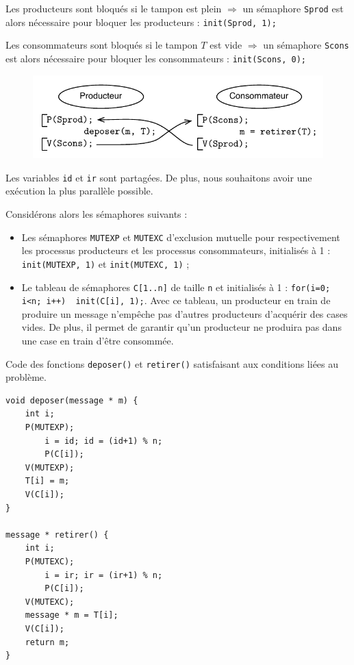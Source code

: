 \documentclass[11pt,english,french]{scrreprt}
\theoremstyle{remark}
\theoremstyle{definition}
\begin{document}
Les producteurs sont bloqués si le tampon est plein $\Rightarrow$ un sémaphore \lstinline!Sprod! est alors nécessaire pour bloquer les producteurs : \lstinline!init(Sprod, 1);!

Les consommateurs sont bloqués si le tampon $T$ est vide $\Rightarrow$ un sémaphore \lstinline!Scons! est alors nécessaire pour bloquer les consommateurs : \lstinline!init(Scons, 0);!

\begin{figure}[h!]
	\center
	\vspace{-10pt}
	\includegraphics[scale=.85]{img/prod-cons2}
	\vspace{-10pt}
\end{figure}

Les variables \lstinline!id! et \lstinline!ir! sont partagées. De plus, nous souhaitons avoir une exécution la plus parallèle possible.

Considérons alors les sémaphores suivants :\begin{itemize}
	\item Les sémaphores \lstinline!MUTEXP! et \lstinline!MUTEXC! d'exclusion mutuelle pour respectivement les processus producteurs et les processus consommateurs, initialisés à 1 : \lstinline!init(MUTEXP, 1)! et \lstinline!init(MUTEXC, 1)! ;
	\item Le tableau de sémaphores \lstinline!C[1..n]! de taille \lstinline!n! et initialisés à 1 : \lstinline!for(i=0; i<n; i++)  init(C[i], 1);!. Avec ce tableau, un producteur en train de produire un message n'empêche pas d'autres producteurs d'acquérir des cases vides. De plus, il permet de garantir qu'un producteur ne produira pas dans une case en train d'être consommée.
\end{itemize}

Code des fonctions \lstinline!deposer()! et \lstinline!retirer()! satisfaisant aux conditions liées au problème.

\begin{lstlisting}[multicols=2,tabsize=4]
void deposer(message * m) {
	int i;
	P(MUTEXP);
		i = id; id = (id+1) % n;
		P(C[i]);
	V(MUTEXP);
	T[i] = m;
	V(C[i]);	
} 

message * retirer() {
	int i;
	P(MUTEXC);
		i = ir; ir = (ir+1) % n;
		P(C[i]);
	V(MUTEXC);
	message * m = T[i];
	V(C[i]);
	return m;
}
\end{lstlisting}
\vspace{-30pt}
\end{document}
